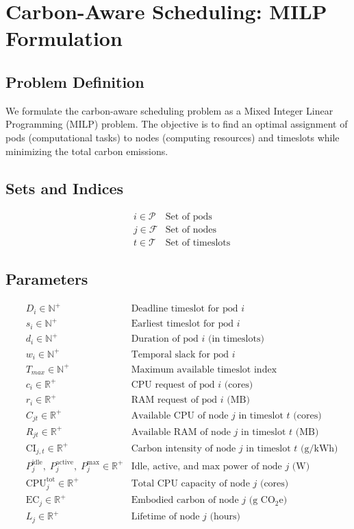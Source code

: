 \documentclass{article}
\begin{document}
\section{Carbon-Aware Scheduling: MILP Formulation}

\subsection{Problem Definition}

We formulate the carbon-aware scheduling problem as a Mixed Integer Linear Programming (MILP) problem. The objective is to find an optimal assignment of pods (computational tasks) to nodes (computing resources) and timeslots while minimizing the total carbon emissions.

\subsection{Sets and Indices}

\begin{align}
& i \in \mathcal{P} & \text{Set of pods} \\
& j \in \mathcal{F} & \text{Set of nodes} \\
& t \in \mathcal{T} & \text{Set of timeslots}
\end{align}

\subsection{Parameters}

\begin{align}
& D_i \in \mathbb{N}^+ & \text{Deadline timeslot for pod $i$} \\
& s_{i} \in \mathbb{N}^+ & \text{Earliest timeslot for pod $i$} \\
& d_i \in \mathbb{N}^+ & \text{Duration of pod $i$ (in timeslots)} \\
& w_i \in \mathbb{N}^+ & \text{Temporal slack for pod $i$} \\
& T_{max} \in \mathbb{N}^+ & \text{Maximum available timeslot index} \\
& c_{i} \in \mathbb{R}^+ & \text{CPU request of pod $i$ (cores)} \\
& r_{i} \in \mathbb{R}^+ & \text{RAM request of pod $i$ (MB)} \\
& C_{jt} \in \mathbb{R}^+ & \text{Available CPU of node $j$ in timeslot $t$ (cores)} \\
& R_{jt} \in \mathbb{R}^+ & \text{Available RAM of node $j$ in timeslot $t$ (MB)} \\
& \text{CI}_{j,t} \in \mathbb{R}^+ & \text{Carbon intensity of node $j$ in timeslot $t$ (g/kWh)} \\
& P^{\text{idle}}_j,\;P^{\text{active}}_j,\;P^{\text{max}}_j \in \mathbb{R}^+ & \text{Idle, active, and max power of node $j$ (W)} \\
& \text{CPU}^{\text{tot}}_j \in \mathbb{R}^+ & \text{Total CPU capacity of node $j$ (cores)} \\
& \text{EC}_j \in \mathbb{R}^+ & \text{Embodied carbon of node $j$ (g CO$_2$e)} \\
& L_j \in \mathbb{R}^+ & \text{Lifetime of node $j$ (hours)} 
\end{align}
\end{document}
